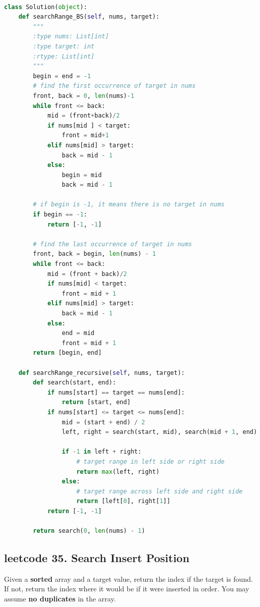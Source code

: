 \documentclass[a4paper,10pt]{article}
\begin{document}
\begin{lstlisting}[language=Python, caption=Problem34. Search for a Range]

class Solution(object):
    def searchRange_BS(self, nums, target):
        """
        :type nums: List[int]
        :type target: int
        :rtype: List[int]
        """
        begin = end = -1
        # find the first occurrence of target in nums
        front, back = 0, len(nums)-1
        while front <= back:
            mid = (front+back)/2
            if nums[mid ] < target:
                front = mid+1
            elif nums[mid] > target:
                back = mid - 1
            else:
                begin = mid
                back = mid - 1

        # if begin is -1, it means there is no target in nums
        if begin == -1:
            return [-1, -1]

        # find the last occurrence of target in nums
        front, back = begin, len(nums) - 1
        while front <= back:
            mid = (front + back)/2
            if nums[mid] < target:
                front = mid + 1
            elif nums[mid] > target:
                back = mid - 1
            else:
                end = mid
                front = mid + 1
        return [begin, end]

    def searchRange_recursive(self, nums, target):
        def search(start, end):
            if nums[start] == target == nums[end]:
                return [start, end]
            if nums[start] <= target <= nums[end]:
                mid = (start + end) / 2
                left, right = search(start, mid), search(mid + 1, end)

                if -1 in left + right:
                    # target range in left side or right side
                    return max(left, right)
                else:
                    # target range across left side and right side
                    return [left[0], right[1]]
            return [-1, -1]

        return search(0, len(nums) - 1)
\end{lstlisting}


\subsection{leetcode 35. Search Insert Position}
Given a \textbf{sorted} array and a target value, return the index if the target is found. If not, return the index where it would be if it were inserted in order. You may assume \textbf{no duplicates} in the array. \\
\end{document}
